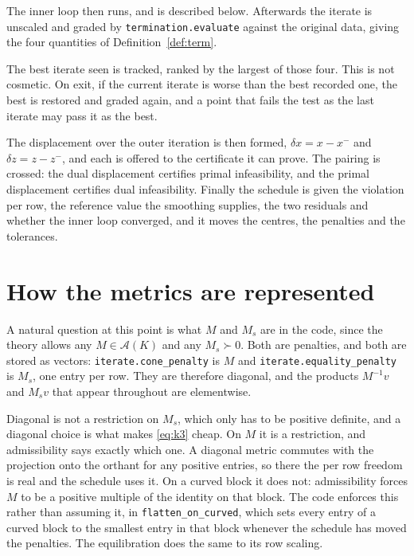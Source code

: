 \documentclass[a4paper,11pt]{book}
\theoremstyle{plain}
\theoremstyle{definition}
\theoremstyle{remark}
\numberwithin{equation}{chapter}
\numberwithin{algorithm}{chapter}
\begin{document}
	The inner loop then runs, and is described below. Afterwards the iterate is
	unscaled and graded by \texttt{termination.evaluate} against the original
	data, giving the four quantities of Definition~\ref{def:term}.

	The best iterate seen is tracked, ranked by the largest of those four. This is
	not cosmetic. On exit, if the
	current iterate is worse than the best recorded one, the best is restored and
	graded again, and a point that fails the test as the last iterate may pass it
	as the best.

	The displacement over the outer iteration is then formed, $\delta x=x-x^-$ and
	$\delta z=z-z^-$, and each is offered to the certificate it can prove. The
	pairing is crossed: the dual displacement certifies primal infeasibility, and
	the primal displacement certifies dual infeasibility. Finally the schedule is
	given the violation per row, the reference value the smoothing supplies, the
	two residuals and whether the inner loop converged, and it moves the centres,
	the penalties and the tolerances.

	\section{How the metrics are represented}

	A natural question at this point is what $M$ and $M_s$ are in the code, since
	the theory allows any $M\in\mathcal{A}(K)$ and any $M_s\succ0$. Both are
	penalties, and both are stored as vectors:
	\texttt{iterate.cone\_penalty} is $M$ and
	\texttt{iterate.equality\_penalty} is $M_s$, one entry per row. They are
	therefore diagonal, and the products $M^{-1}v$ and $M_sv$ that appear
	throughout are elementwise.

	Diagonal is not a restriction on $M_s$, which only has to be positive
	definite, and a diagonal choice is what makes \eqref{eq:k3} cheap. On $M$ it
	is a restriction, and admissibility says exactly which one. A diagonal metric
	commutes with the projection onto the orthant for any positive entries, so
	there the per row freedom is real and the schedule uses it. On a curved block
	it does not: admissibility forces $M$ to be a positive multiple of the
	identity on that block. The code enforces this rather than assuming it, in
	\texttt{flatten\_on\_curved}, which sets every entry of a curved block to the
	smallest entry in that block whenever the schedule has moved the penalties.
	The equilibration does the same to its row scaling.
\end{document}
